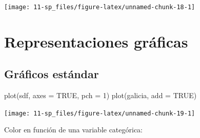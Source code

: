 \documentclass[
  spanish,
]{book}
\newenvironment{Shaded}{\begin{snugshade}}{\end{snugshade}}
\newcommand{\AttributeTok}[1]{\textcolor[rgb]{0.77,0.63,0.00}{#1}}
\newcommand{\CommentTok}[1]{\textcolor[rgb]{0.56,0.35,0.01}{\textit{#1}}}
\newcommand{\ConstantTok}[1]{\textcolor[rgb]{0.00,0.00,0.00}{#1}}
\newcommand{\DecValTok}[1]{\textcolor[rgb]{0.00,0.00,0.81}{#1}}
\newcommand{\FunctionTok}[1]{\textcolor[rgb]{0.00,0.00,0.00}{#1}}
\newcommand{\NormalTok}[1]{#1}
\newcommand{\OtherTok}[1]{\textcolor[rgb]{0.56,0.35,0.01}{#1}}
\newcommand{\SpecialCharTok}[1]{\textcolor[rgb]{0.00,0.00,0.00}{#1}}
\newcommand{\StringTok}[1]{\textcolor[rgb]{0.31,0.60,0.02}{#1}}
\theoremstyle{break}
\theoremstyle{definition}
\theoremstyle{definition}
\theoremstyle{definition}
\theoremstyle{definition}
\theoremstyle{remark}
\begin{document}
\begin{center}\texttt{[image: 11-sp\_files/figure-latex/unnamed-chunk-18-1]} \end{center}

\hypertarget{representaciones-gruxe1ficas}{%
\section{Representaciones gráficas}\label{representaciones-gruxe1ficas}}

\hypertarget{gruxe1ficos-estuxe1ndar}{%
\subsection{Gráficos estándar}\label{gruxe1ficos-estuxe1ndar}}

\begin{Shaded}
\begin{Highlighting}[]
\FunctionTok{plot}\NormalTok{(sdf, }\AttributeTok{axes =} \ConstantTok{TRUE}\NormalTok{, }\AttributeTok{pch =} \DecValTok{1}\NormalTok{)}
\FunctionTok{plot}\NormalTok{(galicia, }\AttributeTok{add =} \ConstantTok{TRUE}\NormalTok{)}
\end{Highlighting}
\end{Shaded}

\begin{center}\texttt{[image: 11-sp\_files/figure-latex/unnamed-chunk-19-1]} \end{center}

Color en función de una variable categórica:

\begin{Shaded}
\end{Shaded}
\end{document}
